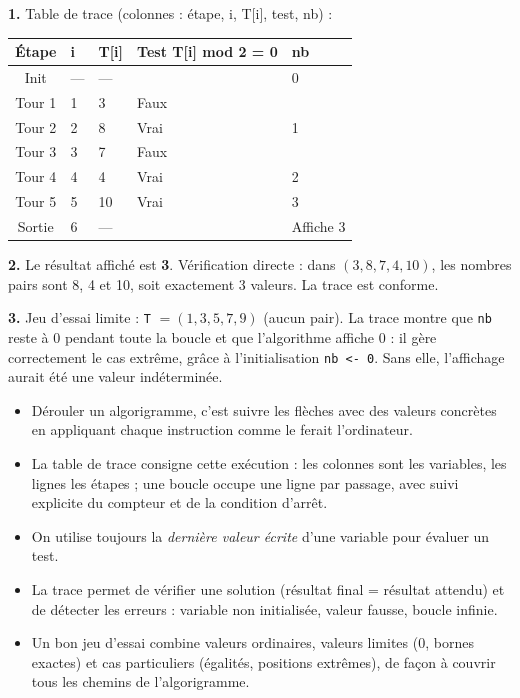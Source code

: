 \documentclass[11pt]{article}
\newcommand{\cle}[1]{{\popxbold\color{popdark}#1}}
\begin{document}
\begin{corrige}[Exercice 1]
\textbf{1.} Table de trace (colonnes : étape, i, T[i], test, nb) :

\begin{center}
\begin{tabularx}{0.9\linewidth}{|c|X|X|l|X|}
\hline
\rowcolor{popblueL} \textbf{Étape} & \textbf{i} & \textbf{T[i]} & \textbf{Test T[i] mod 2 = 0} & \textbf{nb} \\
\hline
Init & --- & --- & & 0 \\
\hline
Tour 1 & 1 & 3 & Faux & \\
\hline
Tour 2 & 2 & 8 & Vrai & 1 \\
\hline
Tour 3 & 3 & 7 & Faux & \\
\hline
Tour 4 & 4 & 4 & Vrai & 2 \\
\hline
Tour 5 & 5 & 10 & Vrai & 3 \\
\hline
Sortie & 6 & --- & & Affiche 3 \\
\hline
\end{tabularx}
\end{center}

\textbf{2.} Le résultat affiché est \textbf{3}. Vérification directe : dans $(3, 8, 7, 4, 10)$, les nombres pairs sont 8, 4 et 10, soit exactement 3 valeurs. La trace est conforme.

\textbf{3.} Jeu d'essai limite : \texttt{T} $= (1, 3, 5, 7, 9)$ (aucun pair). La trace montre que \texttt{nb} reste à $0$ pendant toute la boucle et que l'algorithme affiche $0$ : il gère correctement le cas extrême, grâce à l'initialisation \texttt{nb <- 0}. Sans elle, l'affichage aurait été une valeur indéterminée.
\end{corrige}

\begin{aretenir}
\begin{itemize}
\item \cle{Dérouler} un algorigramme, c'est suivre les flèches avec des valeurs concrètes en appliquant chaque instruction comme le ferait l'ordinateur.
\item La \cle{table de trace} consigne cette exécution : les colonnes sont les variables, les lignes les étapes ; une boucle occupe une ligne par passage, avec suivi explicite du compteur et de la condition d'arrêt.
\item On utilise toujours la \emph{dernière valeur écrite} d'une variable pour évaluer un test.
\item La trace permet de \cle{vérifier} une solution (résultat final = résultat attendu) et de \cle{détecter} les erreurs : variable non initialisée, valeur fausse, boucle infinie.
\item Un bon \cle{jeu d'essai} combine valeurs ordinaires, valeurs limites ($0$, bornes exactes) et cas particuliers (égalités, positions extrêmes), de façon à couvrir tous les chemins de l'algorigramme.
\end{itemize}
\end{aretenir}
\end{document}
